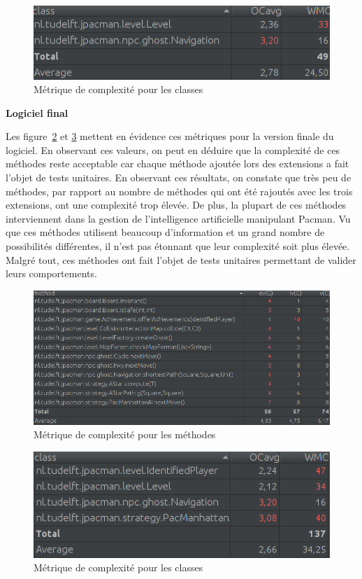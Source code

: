 \documentclass[12pt, openany]{report}
\begin{document}
\begin{figure}[!h]
	\centering
	\includegraphics[scale=0.6]{Images/ComplexityMetrics2.png} 
	\caption{Métrique de complexité pour les classes}
	\label{ComplexityMetrics2}
\end{figure}
\newpage
\textbf{Logiciel final}

Les figure~\ref{ComplexityMetrics3} et \ref{ComplexityMetrics4}  mettent en évidence ces métriques pour la version finale du logiciel. En observant ces valeurs, on peut en déduire que la complexité de ces méthodes reste acceptable car chaque méthode ajoutée lors des extensions a fait l'objet de tests unitaires. En observant ces résultats, on constate que très peu de méthodes, par rapport au nombre de méthodes qui ont été rajoutés avec les trois extensions, ont une complexité trop élevée. De plus, la plupart de ces méthodes interviennent dans la gestion de l'intelligence artificielle manipulant Pacman. Vu que ces méthodes utilisent beaucoup d'information et un grand nombre de possibilités différentes, il n'est pas étonnant que leur complexité soit plus élevée. Malgré tout, ces méthodes ont fait l'objet de tests unitaires permettant de valider leurs comportements.

\begin{figure}[!h]
	\centering
	\includegraphics[scale=0.6]{Images/ComplexityMetrics3.png} 
	\caption{Métrique de complexité pour les méthodes}
	\label{ComplexityMetrics3}
\end{figure}


\begin{figure}[!h]
	\centering
	\includegraphics[scale=0.6]{Images/ComplexityMetrics4.png} 
	\caption{Métrique de complexité pour les classes}
	\label{ComplexityMetrics4}
\end{figure}
\end{document}
